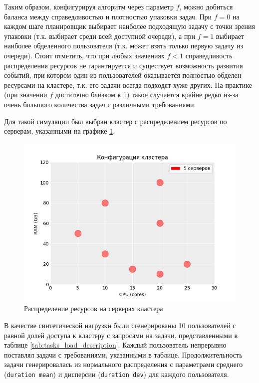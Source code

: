 Таким образом, конфигурируя алгоритм через параметр $f$, можно добиться баланса между справедливостью и плотностью упаковки задач. При $f = 0$ на каждом шаге планировщик выбирает наиболее подходящую задачу с точки зрения упаковки (т.к. выбирает среди всей доступной очереди), а при $f = 1$ выбирает наиболее обделенного пользователя (т.к. может взять только первую задачу из очереди). Стоит отметить, что при любых значениях $f < 1$ справедливость распределения ресурсов не гарантируется и существует возможность развития событий, при котором один из пользователей оказывается полностью обделен ресурсами на кластере, т.к. его задачи всегда подходят хуже других. На практике (при значении $f$ достаточно близком к 1) такое случается крайне редко из-за очень большого количества задач с различными требованиями. 

Для такой симуляции был выбран кластер с распределением ресурсов по серверам, указанными на графике \ref{fig:cluster-resources-distribution}.

\begin{figure}[h!]
    \centering 
    \includegraphics[width=0.7\linewidth]{images/hosts_distribution}
    \caption{Распределение ресурсов на серверах кластера}
    \label{fig:cluster-resources-distribution}
\end{figure}

В качестве синтетической нагрузки были сгенерированы 10 пользователей с равной долей доступа к кластеру с запросами на задачи, представленными в таблице \ref{tab:tasks_load_description}. Каждый пользователь непрерывно поставлял задачи с требованиями, указанными в таблице. Продолжительность задачи генерировалась из нормального распределения с параметрами среднего (\texttt{duration mean}) и дисперсии (\texttt{duration dev}) для каждого пользователя. 

